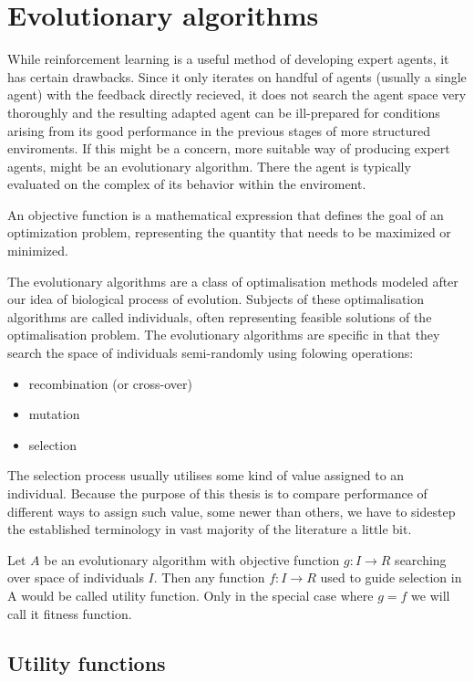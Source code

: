 \chapter{Evolutionary algorithms}
While reinforcement learning is a useful method of developing expert agents, it has certain drawbacks. Since it only iterates on handful of agents (usually a single agent) with the feedback directly recieved, it does not search the agent space very thoroughly and the resulting adapted agent can be ill-prepared for conditions arising from its good performance in the previous stages of more structured enviroments. 
If this might be a concern, more suitable way of producing expert agents, might be an evolutionary algorithm. There the agent is typically evaluated on the complex of its behavior within the enviroment.
\begin{defn}
An objective function is a mathematical expression that defines the goal of an optimization problem, representing the quantity that needs to be maximized or minimized.
\end{defn}
The evolutionary algorithms are a class of optimalisation methods modeled after our idea of biological process of evolution. Subjects of these optimalisation algorithms are called individuals, often representing feasible solutions of the optimalisation problem. The evolutionary algorithms are specific in that they search the space of individuals semi-randomly using folowing operations:
\begin{itemize}
	\item recombination (or cross-over)
	\item mutation
	\item selection 
\end{itemize}
The selection process usually utilises some kind of value assigned to an individual. Because the purpose of this thesis is to compare performance of different ways to assign such value, some newer than others, we have to sidestep the established terminology in vast majority of the literature a little bit.
\begin{defn}
Let $ A $ be an evolutionary algorithm with objective function $ g: I\rightarrow R $ searching over space of individuals $ I $. Then any function $ f: I\rightarrow R $ used to guide selection in A would be called utility function. Only in the special case where $ g=f $ we will call it fitness function.
\end{defn}
\section{Utility functions}

